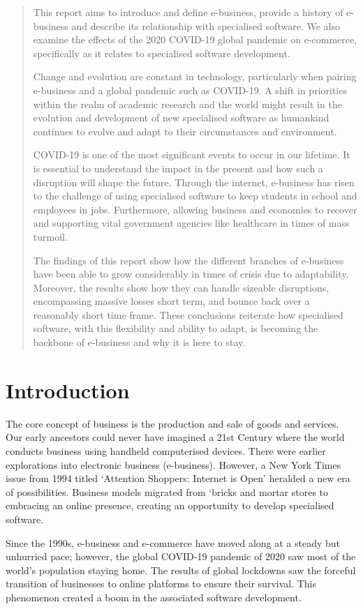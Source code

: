 \documentclass[a0,portrait]{a0poster}
\begin{document}
\begin{multicols}{2}

\begin{abstract}
This report aims to introduce and define e-business, provide a history of e-business and describe its relationship with specialised software. We also examine the effects of the 2020 COVID-19 global pandemic on e-commerce, specifically as it relates to specialised software development. \par
Change and evolution are constant in technology, particularly when pairing e-business and a global pandemic such as COVID-19. A shift in priorities within the realm of academic research and the world might result in the evolution and development of new specialised software as humankind continues to evolve and adapt to their circumstances and environment. \par
COVID-19 is one of the most significant events to occur in our lifetime. It is essential to understand the impact in the present and how such a disruption will shape the future. Through the internet, e-business has risen to the challenge of using specialised software to keep students in school and employees in jobs. Furthermore, allowing business and economies to recover and supporting vital government agencies like healthcare in times of mass turmoil. \par
The findings of this report show how the different branches of e-business have been able to grow considerably in times of crisis due to adaptability. Moreover, the results show how they can handle sizeable disruptions, encompassing massive losses short term, and bounce back over a reasonably short time frame. These conclusions reiterate how specialised software, with this flexibility and ability to adapt, is becoming the backbone of e-business and why it is here to stay. \par
\end{abstract}

\color{Teal}

\section*{Introduction}
The core concept of business is the production and sale of goods and services. Our early ancestors could never have imagined a 21st Century where the world conducts business using handheld computerised devices. There were earlier explorations into electronic business (e-business). However, a New York Times issue from 1994 titled ‘Attention Shoppers: Internet is Open’ \cite{lewis} heralded a new era of possibilities. Business models migrated from ‘bricks and mortar stores to embracing an online presence, creating an opportunity to develop specialised software. \par 
Since the 1990s, e-business and e-commerce have moved along at a steady but unhurried pace; however, the global COVID-19 pandemic of 2020 saw most of the world’s population staying home. The results of global lockdowns saw the forceful transition of businesses to online platforms to ensure their survival. This phenomenon created a boom in the associated software development. \par


\end{multicols}
\end{document}
